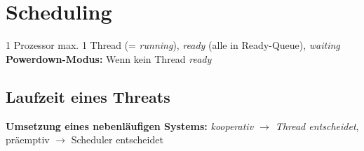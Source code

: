 \section{Scheduling}
1 Prozessor max. 1 Thread (= \textit{running}), \textit{ready} (alle in Ready-Queue), \textit{waiting}
\textbf{Powerdown-Modus: }Wenn kein Thread \textit{ready}


\subsection{Laufzeit eines Threats}
\textbf{Umsetzung eines nebenläufigen Systems: }\textit{kooperativ $\rightarrow$ Thread entscheidet}, präemptiv $\rightarrow$ Scheduler entscheidet


